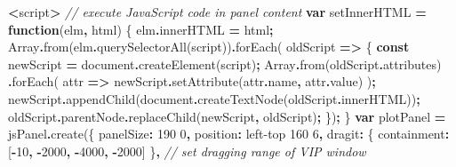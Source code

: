 \documentclass[
]{article}
\newenvironment{Shaded}{\begin{snugshade}}{\end{snugshade}}
\newcommand{\AttributeTok}[1]{\textcolor[rgb]{0.77,0.63,0.00}{#1}}
\newcommand{\BuiltInTok}[1]{#1}
\newcommand{\CommentTok}[1]{\textcolor[rgb]{0.56,0.35,0.01}{\textit{#1}}}
\newcommand{\DataTypeTok}[1]{\textcolor[rgb]{0.13,0.29,0.53}{#1}}
\newcommand{\DecValTok}[1]{\textcolor[rgb]{0.00,0.00,0.81}{#1}}
\newcommand{\FunctionTok}[1]{\textcolor[rgb]{0.00,0.00,0.00}{#1}}
\newcommand{\KeywordTok}[1]{\textcolor[rgb]{0.13,0.29,0.53}{\textbf{#1}}}
\newcommand{\NormalTok}[1]{#1}
\newcommand{\OperatorTok}[1]{\textcolor[rgb]{0.81,0.36,0.00}{\textbf{#1}}}
\newcommand{\StringTok}[1]{\textcolor[rgb]{0.31,0.60,0.02}{#1}}
\begin{document}
\begin{Shaded}
\begin{Highlighting}[]
\OperatorTok{\textless{}}\NormalTok{script}\OperatorTok{\textgreater{}}
  \CommentTok{// execute JavaScript code in panel content}
  \KeywordTok{var}\NormalTok{ setInnerHTML }\OperatorTok{=} \KeywordTok{function}\NormalTok{(elm}\OperatorTok{,}\NormalTok{ html) \{}
\NormalTok{    elm}\OperatorTok{.}\AttributeTok{innerHTML} \OperatorTok{=}\NormalTok{ html}\OperatorTok{;}
    \BuiltInTok{Array}\OperatorTok{.}\FunctionTok{from}\NormalTok{(elm}\OperatorTok{.}\FunctionTok{querySelectorAll}\NormalTok{(}\StringTok{\textquotesingle{}script\textquotesingle{}}\NormalTok{))}\OperatorTok{.}\FunctionTok{forEach}\NormalTok{( oldScript }\KeywordTok{=\textgreater{}}\NormalTok{ \{}
      \KeywordTok{const}\NormalTok{ newScript }\OperatorTok{=} \BuiltInTok{document}\OperatorTok{.}\FunctionTok{createElement}\NormalTok{(}\StringTok{\textquotesingle{}script\textquotesingle{}}\NormalTok{)}\OperatorTok{;}
      \BuiltInTok{Array}\OperatorTok{.}\FunctionTok{from}\NormalTok{(oldScript}\OperatorTok{.}\AttributeTok{attributes}\NormalTok{)}
      \OperatorTok{.}\FunctionTok{forEach}\NormalTok{( attr }\KeywordTok{=\textgreater{}}\NormalTok{ newScript}\OperatorTok{.}\FunctionTok{setAttribute}\NormalTok{(attr}\OperatorTok{.}\AttributeTok{name}\OperatorTok{,}\NormalTok{ attr}\OperatorTok{.}\AttributeTok{value}\NormalTok{) )}\OperatorTok{;}
\NormalTok{      newScript}\OperatorTok{.}\FunctionTok{appendChild}\NormalTok{(}\BuiltInTok{document}\OperatorTok{.}\FunctionTok{createTextNode}\NormalTok{(oldScript}\OperatorTok{.}\AttributeTok{innerHTML}\NormalTok{))}\OperatorTok{;}
\NormalTok{      oldScript}\OperatorTok{.}\AttributeTok{parentNode}\OperatorTok{.}\FunctionTok{replaceChild}\NormalTok{(newScript}\OperatorTok{,}\NormalTok{ oldScript)}\OperatorTok{;}
\NormalTok{    \})}\OperatorTok{;}
\NormalTok{  \}}
  \KeywordTok{var}\NormalTok{ plotPanel }\OperatorTok{=}\NormalTok{ jsPanel}\OperatorTok{.}\FunctionTok{create}\NormalTok{(\{}
    \DataTypeTok{panelSize}\OperatorTok{:} \StringTok{\textquotesingle{}190 0\textquotesingle{}}\OperatorTok{,}
    \DataTypeTok{position}\OperatorTok{:} \StringTok{\textquotesingle{}left{-}top 160 6\textquotesingle{}}\OperatorTok{,}
    \DataTypeTok{dragit}\OperatorTok{:}\NormalTok{ \{ }\DataTypeTok{containment}\OperatorTok{:}\NormalTok{ [}\OperatorTok{{-}}\DecValTok{10}\OperatorTok{,} \OperatorTok{{-}}\DecValTok{2000}\OperatorTok{,} \OperatorTok{{-}}\DecValTok{4000}\OperatorTok{,} \OperatorTok{{-}}\DecValTok{2000}\NormalTok{] \}}\OperatorTok{,} \CommentTok{// set dragging range of VIP window}

\end{Highlighting}
\end{Shaded}
\end{document}
